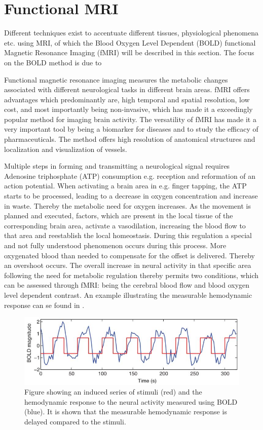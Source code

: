 \section{Functional MRI}

Different techniques exist to accentuate different tissues, physiological phenomena etc. using MRI, of which the Blood Oxygen Level Dependent (BOLD) functional Magnetic Resonance Imaging (fMRI) will be described in this section. The focus on the BOLD method is due to  

Functional magnetic resonance imaging measures the metabolic changes associated with different neurological tasks in different brain areas. fMRI offers advantages which predominantly are, high temporal and spatial resolution, low cost, and most importantly being non-invasive, which has made it a exceedingly popular method for imaging brain activity. The versatility of fMRI has made it a very important tool by being a biomarker for diseases and to study the efficacy of pharmaceuticals. The method offers high resolution of anatomical structures and localization and visualization of vessels. \cite{Glover2011} 

Multiple steps in forming and transmitting a neurological signal requires Adenosine triphosphate (ATP) consumption e.g. reception and reformation of an action potential. When activating a brain area in e.g. finger tapping, the ATP starts to be processed, leading to a decrease in oxygen concentration and increase in waste. Thereby the metabolic need for oxygen increases. As the movement is planned and executed, factors, which are present in the local tissue of the corresponding brain area, activate a vasodilation, increasing the blood flow to that area and reestablish the local homeostasis. During this regulation a special and not fully understood phenomenon occurs during this process. More oxygenated blood than needed to compensate for the offset is delivered. Thereby an overshoot occurs. The overall increase in neural activity in that specific area following the need for metabolic regulation thereby permits two conditions, which can be assessed through fMRI: being the cerebral blood flow and blood oxygen level dependent contrast. An example illustrating the measurable hemodynamic response can se found in . \cite{Glover2011,Poldrack2011}

\begin{figure}[H]                 
	\includegraphics[width=.69\textwidth]{figures/aBackground/stimuli_vs_response}  
	\caption{Figure showing an induced series of stimuli (red) and the hemodynamic response to the neural activity measured using BOLD (blue). It is shown that the measurable hemodynamic response is delayed compared to the stimuli. \cite{Poldrack2011}}
	\label{fig:back:stim} 
\end{figure}

